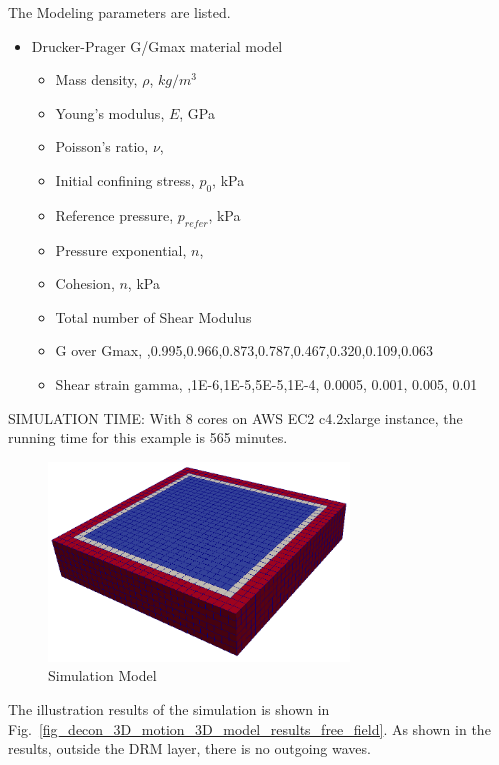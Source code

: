 The Modeling parameters are listed.
\begin{itemize}
  \item Drucker-Prager G/Gmax material model 
  \begin{itemize}
    \item Mass density, $\rho$, \enspace {} $kg/m^3$
    \item Young's modulus, $E$, \enspace {} GPa
    \item Poisson's ratio, $\nu$, \enspace {}
    \item Initial confining stress, $p_0$, \enspace {} kPa
    \item Reference pressure, $p_{refer} $, \enspace {} kPa
    \item Pressure exponential, $ n  $, \enspace {}
    \item Cohesion, $ n  $, \enspace {} kPa
    \item Total number of Shear Modulus \enspace {}
    \item G over Gmax, \enspace {},0.995,0.966,0.873,0.787,0.467,0.320,0.109,0.063
    \item Shear strain gamma, \enspace {},1E-6,1E-5,5E-5,1E-4, 0.0005, 0.001, 0.005, 0.01
  \end{itemize}
\end{itemize}


SIMULATION TIME: With 8 cores on AWS EC2 c4.2xlarge instance, the running time for this example is 565 minutes.




\begin{figure}[H]
  \centering
  \includegraphics[width = 8cm]{./Figure-files/nonlinear_analysis_steps/free_field_3D/overview.png}
  \caption{Simulation Model}
  \label{fig_nonlinear_motion_3D_model}
\end{figure}

The illustration results of the simulation is shown in Fig.~\ref{fig_decon_3D_motion_3D_model_results_free_field}.
As shown in the results, outside the DRM layer, there is no outgoing waves. 

